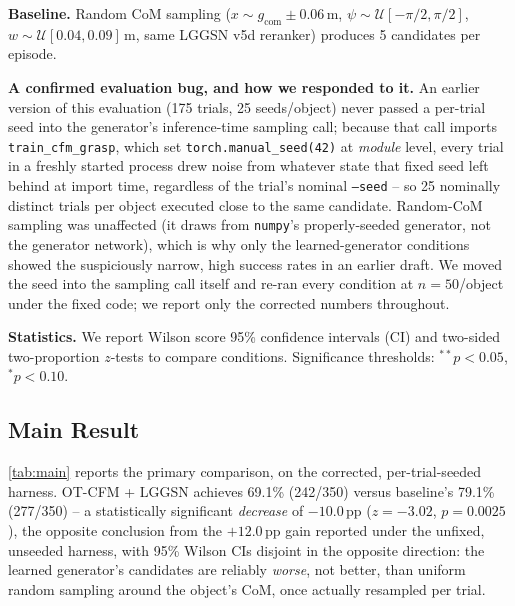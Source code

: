 \documentclass[journal]{IEEEtran}
\begin{document}
\noindent\textbf{Baseline.}
Random CoM sampling ($x \sim g_\text{com} \pm 0.06$\,m,
$\psi \sim \mathcal{U}[-\pi/2, \pi/2]$, $w \sim \mathcal{U}[0.04, 0.09]$\,m,
same LGGSN v5d reranker) produces 5 candidates per episode.

\noindent\textbf{A confirmed evaluation bug, and how we responded to it.}
An earlier version of this evaluation (175 trials, 25 seeds/object) never
passed a per-trial seed into the generator's inference-time sampling call;
because that call imports \texttt{train\_cfm\_grasp}, which set
\texttt{torch.manual\_seed(42)} at \emph{module} level, every trial in a
freshly started process drew noise from whatever state that fixed seed left
behind at import time, regardless of the trial's nominal \texttt{--seed} --
so 25 nominally distinct trials per object executed close to the same
candidate. Random-CoM sampling was unaffected (it draws from
\texttt{numpy}'s properly-seeded generator, not the generator network),
which is why only the learned-generator conditions showed the suspiciously
narrow, high success rates in an earlier draft. We moved the seed into the
sampling call itself and re-ran every condition at $n{=}50$/object under the
fixed code; we report only the corrected numbers throughout.

\noindent\textbf{Statistics.}
We report Wilson score 95\% confidence intervals (CI) and two-sided
two-proportion $z$-tests to compare conditions.
Significance thresholds: $^{**}\!p{<}0.05$, $^*\!p{<}0.10$.

\subsection{Main Result}

\begin{table}[t]
\caption{Overall success rate: 350 trials (7 objects $\times$ 50 seeds),
  fixed-seeding harness.}
\label{tab:main}
\centering
{}
\end{table}

\cref{tab:main} reports the primary comparison, on the corrected,
per-trial-seeded harness. OT-CFM + LGGSN achieves 69.1\% (242/350) versus
baseline's 79.1\% (277/350) -- a statistically significant \emph{decrease}
of $-10.0$\,pp ($z{=}-3.02$, $p{=}0.0025$), the opposite conclusion from the
$+12.0$\,pp gain reported under the unfixed, unseeded harness, with 95\%
Wilson CIs disjoint in the opposite direction: the learned generator's
candidates are reliably \emph{worse}, not better, than uniform random
sampling around the object's CoM, once actually resampled per trial.
\end{document}
